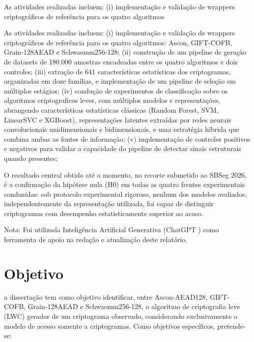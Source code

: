 As atividades realizadas incluem: (i) implementação e validação de wrappers criptográficos de referência para os quatro algoritmos



As atividades realizadas incluem: (i) implementação e validação de wrappers criptográficos de referência para os quatro algoritmos: Ascon, GIFT-COFB, Grain-128AEAD e Schwaemm256-128; (ii) construção de um pipeline de geração de datasets de 180.000 amostras encadeadas entre os quatro algoritmos e dois controles; (iii) extração de 641 características estatísticas dos criptogramas, organizadas em doze famílias, e implementação de um pipeline de seleção em múltiplos estágios; (iv) condução de experimentos de classificação sobre os algoritmos criptograficos leves, com múltiplos modelos e representações, abrangendo características estatísticas clássicas (Random Forest, SVM, LinearSVC e XGBoost), representações latentes extraídas por redes neurais convolucionais unidimensionais e bidimensionais, e uma estratégia híbrida que combina ambas as fontes de informação; (v) implementação de controles positivos e negativos para validar a capacidade do pipeline de detectar sinais estruturais quando presentes;  

O resultado central obtido até o momento, no recorte submetido ao SBSeg 2026, é a confirmação da hipótese nula (H0) em todas as quatro frentes experimentais conduzidas: sob protocolo experimental rigoroso, nenhum dos modelos avaliados, independentemente da representação utilizada, foi capaz de distinguir criptogramas com desempenho estatisticamente superior ao acaso. 
 

Nota: Foi utilizada Inteligência Artificial Generativa (ChatGPT ) como ferramenta de apoio na redação e atualização deste relatório.

















\section{Objetivo}
a dissertação tem como objetivo identificar, entre Ascon-AEAD128, GIFT-
COFB, Grain-128AEAD e Schwaemm256-128, o algoritmo de criptografia leve (LWC)
gerador de um criptograma observado, considerando exclusivamente o modelo de acesso
somente a criptogramas.
Como objetivos específicos, pretende-se:

